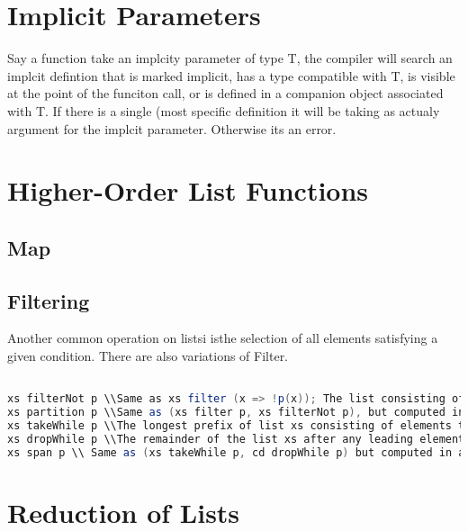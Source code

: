 \documentclass[10pt, a4paper]{report}
\begin{document}
\section{Implicit Parameters}

Say a function take an implcity parameter of type T, the compiler will search an implcit defintion that is marked implicit, has a type compatible with T, is visible at the point of the funciton  call, or is defined in a companion object associated with T. If there is a single (most specific definition it will be taking as actualy argument for the implcit parameter. Otherwise its an error.

\section{Higher-Order List Functions}
\subsection{Map}

\subsection{Filtering}

Another common operation on listsi isthe selection of all elements satisfying a given condition. There are also variations of Filter.

\begin{lstlisting}[language=scala]

xs filterNot p \\Same as xs filter (x => !p(x)); The list consisting of those elements of xs that do not satisfy the predicate p.
xs partition p \\Same as (xs filter p, xs filterNot p), but computed in a single traversal of the list xs.
xs takeWhile p \\The longest prefix of list xs consisting of elements that all satisfy the predicate p
xs dropWhile p \\The remainder of the list xs after any leading element satisfying p have been removed.
xs span p \\ Same as (xs takeWhile p, cd dropWhile p) but computed in a single traversal of the list xs.

\end{lstlisting}

\section{Reduction of Lists}
\end{document}
